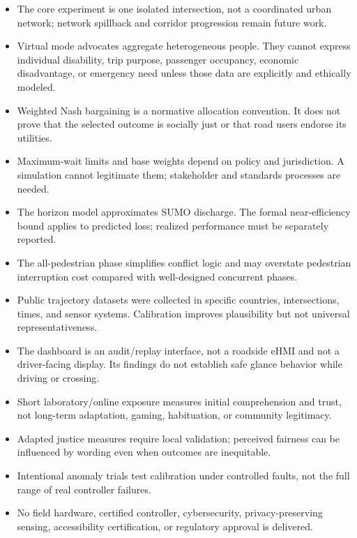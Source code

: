 \documentclass[
  english,
  11pt,
  a4paper,
]{article}
\providecommand{\tightlist}{%
  \setlength{\itemsep}{0pt}\setlength{\parskip}{0pt}}
\begin{document}
\begin{itemize}
\tightlist
\item
  The core experiment is one isolated intersection, not a coordinated
  urban network; network spillback and corridor progression remain
  future work.
\item
  Virtual mode advocates aggregate heterogeneous people. They cannot
  express individual disability, trip purpose, passenger occupancy,
  economic disadvantage, or emergency need unless those data are
  explicitly and ethically modeled.
\item
  Weighted Nash bargaining is a normative allocation convention. It does
  not prove that the selected outcome is socially just or that road
  users endorse its utilities.
\item
  Maximum-wait limits and base weights depend on policy and
  jurisdiction. A simulation cannot legitimate them; stakeholder and
  standards processes are needed.
\item
  The horizon model approximates SUMO discharge. The formal
  near-efficiency bound applies to predicted loss; realized performance
  must be separately reported.
\item
  The all-pedestrian phase simplifies conflict logic and may overstate
  pedestrian interruption cost compared with well-designed concurrent
  phases.
\item
  Public trajectory datasets were collected in specific countries,
  intersections, times, and sensor systems. Calibration improves
  plausibility but not universal representativeness.
\item
  The dashboard is an audit/replay interface, not a roadside eHMI and
  not a driver-facing display. Its findings do not establish safe glance
  behavior while driving or crossing.
\item
  Short laboratory/online exposure measures initial comprehension and
  trust, not long-term adaptation, gaming, habituation, or community
  legitimacy.
\item
  Adapted justice measures require local validation; perceived fairness
  can be influenced by wording even when outcomes are inequitable.
\item
  Intentional anomaly trials test calibration under controlled faults,
  not the full range of real controller failures.
\item
  No field hardware, certified controller, cybersecurity,
  privacy-preserving sensing, accessibility certification, or regulatory
  approval is delivered.
\end{itemize}
\end{document}
